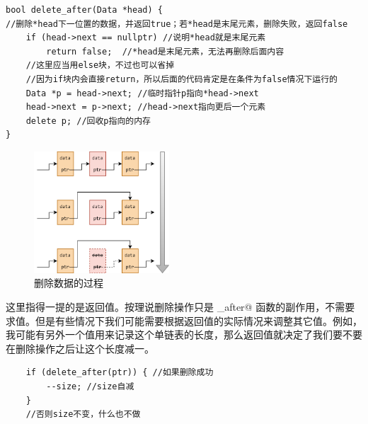 \begin{lstlisting}
bool delete_after(Data *head) {
//删除*head下一位置的数据，并返回true；若*head是末尾元素，删除失败，返回false
    if (head->next == nullptr) //说明*head就是末尾元素
        return false;  //*head是末尾元素，无法再删除后面内容
    //这里应当用else块，不过也可以省掉
    //因为if块内会直接return，所以后面的代码肯定是在条件为false情况下运行的
    Data *p = head->next; //临时指针p指向*head->next
    head->next = p->next; //head->next指向更后一个元素
    delete p; //回收p指向的内存
}
\end{lstlisting}
\begin{figure}[htbp]
    \centering
    \includegraphics[width=0.45\textwidth]{../images/generalized_parts/06_deletion_operation_on_a_list_300.png}
    \caption{删除数据的过程}
\end{figure}\par
这里指得一提的是返回值。按理说删除操作只是 \lstinline@delete_after@ 函数的副作用，不需要求值。但是有些情况下我们可能需要根据返回值的实际情况来调整其它值。例如，我可能有另外一个值用来记录这个单链表的长度，那么返回值就决定了我们要不要在删除操作之后让这个长度减一。
\begin{lstlisting}
    if (delete_after(ptr)) { //如果删除成功
        --size; //size自减
    }
    //否则size不变，什么也不做
\end{lstlisting}\par
